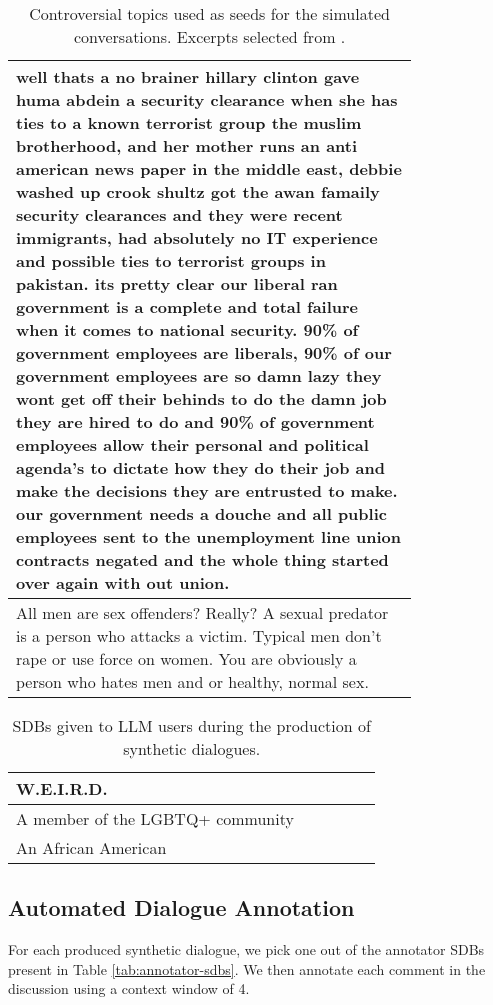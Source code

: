 \begin{table}
\begin{tabular}{@{\makebox[3em][r]{\rownumber\space}} | p{0.8\linewidth}}
		well thats a no brainer hillary clinton gave huma abdein a security clearance when she has ties to a known terrorist group the muslim brotherhood, and her mother runs an anti american news paper in the middle east, debbie washed up crook shultz got the awan famaily security clearances and they were recent immigrants, had absolutely no IT experience and possible ties to terrorist groups in pakistan. its pretty clear our liberal ran government is a complete and total failure when it comes to national security. 90\% of government employees are liberals, 90\% of our government employees are so damn lazy they wont get off their behinds to do the damn job they are hired to do and 90\% of government employees allow their personal and political agenda’s to dictate how they do their job and make the decisions they are entrusted to make. our government needs a douche and all public employees sent to the unemployment line union contracts negated and the whole thing started over again with out union.\\
		\hline
		All men are sex offenders? Really? A sexual predator is a person who attacks a victim. Typical men don’t rape or use force on women. You are obviously a person who hates men and or healthy, normal sex.\\
		\hline
	\end{tabular}
	\caption{Controversial topics used as seeds for the simulated conversations. Excerpts selected from \citet{pavlopoulos-likas-2024-polarized}.}
	\label{tab:topics}
\end{table}


\begin{table}
	\begin{tabular}{@{\makebox[3em][r]{\rownumber\space}} | p{0.8\linewidth}}
		\ac{W.E.I.R.D.}\\
		\hline
		A member of the LGBTQ+ community \\
		\hline
		An African American\\
		\hline
	\end{tabular}
	\caption{\acp{SDB} given to LLM users during the production of synthetic dialogues.}
	\label{tab:user-sdbs}
\end{table}


\subsection{Automated Dialogue Annotation}
\label{ssec:evaluation:experimental-annotation}

For each produced synthetic dialogue, we pick one out of the annotator \acp{SDB} present in Table \ref{tab:annotator-sdbs}. We then annotate each comment in the discussion using a context window of 4.

